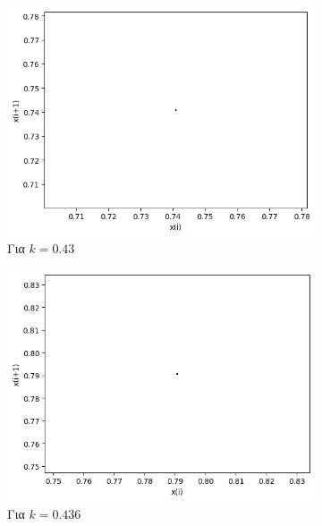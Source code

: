 \begin{figure}[ht]
	\centering
	\begin{subfigure}[b]{0.4\textwidth}
		\centering
		\includegraphics[width=\textwidth]{LateX images/graphs q09/g3}
		\caption{Για $k=0.43$}
		\label{f:k48}
	\end{subfigure}
	\hfill
	\begin{subfigure}[b]{0.4\textwidth}
		\centering
		\includegraphics[width=\textwidth]{LateX images/graphs q09/g4}
		\caption{Για $k=0.436$}
		\label{f:k49}
	\end{subfigure}
	\hfill
	\begin{subfigure}[b]{0.4\textwidth}
		\centering

\end{subfigure}
\end{figure}
